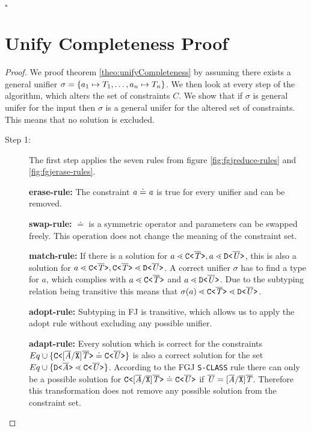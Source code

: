     \hfill $\square$

\section{Unify Completeness Proof}\label{chapter:unifyCompletenessProof}
\begin{proof}

We proof theorem \ref{theo:unifyCompleteness} by assuming there exists a general unifier $\sigma = \{ a_1 \mapsto T_1, \ldots , a_n \mapsto T_n \}$.
We then look at every step of the algorithm, which alters the set of constraints $C$.
We show that if $\sigma$ is general unifer for the input then $\sigma$ is a
general unifer for the altered set of constraints. This means that no solution
is excluded.



\begin{description}
\item[Step 1:]
The first step applies the seven rules from figure
\ref{fig:fgjreduce-rules} and \ref{fig:fgjerase-rules}.

\textbf{erase-rule:} The constraint $\mathit{ a } \doteq \mathit{ a }$ is true for every unifier and can be removed.

\textbf{swap-rule:} $\doteq$ is a symmetric operator and parameters can be swapped freely.
This operation does not change the meaning of the constraint set.

\textbf{match-rule:}
If there is a solution for $a \lessdot \mathtt{C \texttt{<} \overline{\tt \mathit{T}} \texttt{>} }, a \lessdot \mathtt{D \texttt{<} \overline{\tt \mathit{U}} \texttt{>} }$,
this is also a solution for $a \lessdot \mathtt{C \texttt{<} \overline{\tt \mathit{T}} \texttt{>} }, \mathtt{C \texttt{<} \overline{\tt \mathit{T}} \texttt{>} } \lessdot \mathtt{D \texttt{<} \overline{\tt \mathit{U}} \texttt{>} }$.
A correct unifier $\sigma$ has to find a type for $a$, which complies with $a \lessdot \mathtt{C \texttt{<} \overline{\tt \mathit{T}} \texttt{>} }$ and $a \lessdot \mathtt{D \texttt{<} \overline{\tt \mathit{U}} \texttt{>} }$.
Due to the subtyping relation being transitive this means that $\sigma(a) \lessdot \mathtt{C \texttt{<} \overline{\tt \mathit{T}} \texttt{>} } \lessdot \mathtt{D \texttt{<} \overline{\tt \mathit{U}} \texttt{>} }$.

\textbf{adopt-rule:} Subtyping in FJ is transitive,
which allows us to apply the adopt rule without excluding any possible unifier.

\textbf{adapt-rule:} Every solution which is correct for the constraints
$Eq \cup \{  \mathtt{C \texttt{<} [\overline{\tt \mathit{A}}/\overline{\tt X}]\overline{\tt \mathit{T}} \texttt{>} } \doteq \mathtt{C \texttt{<} \overline{\tt \mathit{U}} \texttt{>} } \}$ is also
a correct solution for the set $Eq \cup \{  \mathtt{D \texttt{<} \overline{\tt \mathit{A}} \texttt{>} } \lessdot \mathtt{C \texttt{<} \overline{\tt \mathit{U}} \texttt{>} } \}$.
According to the FGJ \texttt{S-CLASS} rule there can only be a possible solution for 
$\mathtt{C \texttt{<} [\overline{\tt \mathit{A}}/\overline{\tt X}]\overline{\tt \mathit{T}} \texttt{>} } \doteq \mathtt{C \texttt{<} \overline{\tt \mathit{U}} \texttt{>} }$
if $\overline{\tt \mathit{U}} = [\overline{\tt \mathit{A}}/\overline{\tt X}]\overline{\tt \mathit{T}}$.
Therefore this transformation does not remove any possible solution from the constraint set.


\end{description}
\end{proof}
